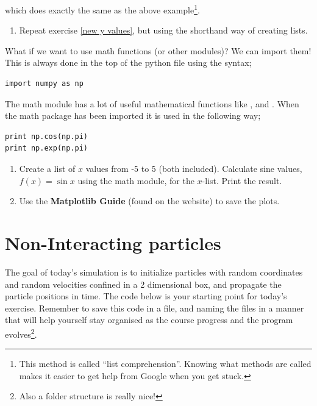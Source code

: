 \documentclass{article}
\begin{document}
which does exactly the same as the above example\footnote{This method is called ``list comprehension''. Knowing what methods are called makes it easier to get help from Google when you get stuck.}.

\begin{enumerate}[resume]
    \item Repeat exercise \ref{new y values}, but using the shorthand way of creating lists.
\end{enumerate}

What if we want to use math functions (or other modules)?
We can import them! This is always done in the top of the
python file using the syntax;

\begin{lstlisting}
import numpy as np
\end{lstlisting}

The math module has a lot of useful mathematical functions like ,  and .
When the math package has been imported it is used in the following way;

\begin{lstlisting}
print np.cos(np.pi)
print np.exp(np.pi)
\end{lstlisting}

\begin{enumerate}[resume]
    \item Create a list of $x$ values from -5 to 5 (both included).
    Calculate sine values, $f(x) = \sin{x}$ using the math module,
    for the $x$-list.
    Print the result.
    \item Use the \textbf{Matplotlib Guide} (found on the website) to save the plots.
\end{enumerate}

%
%
%

\newpage
\section{Non-Interacting particles}

The goal of today's simulation is to initialize particles with random coordinates and random velocities confined in a 2 dimensional box, and propagate the particle positions in time.
%
The code below is your starting point for today's exercise.
Remember to save this code in a  file, and naming the files in a manner that will help yourself stay organised as the course progress and the program evolves\footnote{Also a folder structure is really nice!}.
\end{document}
